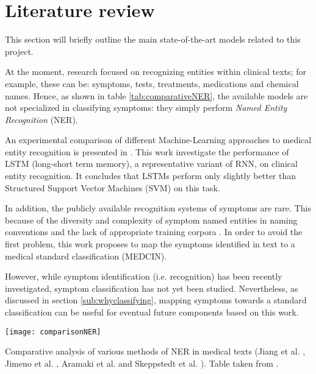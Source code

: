 \section{Literature review}
This section will briefly outline the main state-of-the-art models related to this project.

At the moment, research focused on recognizing entities within clinical texts; for example, these can be: symptoms, tests, treatments, medications and chemical names. Hence, as shown in table \ref{tab:comparativeNER}, the available models are not specialized in classifying symptoms: they simply perform \textit{Named Entity Recognition} (NER).

An experimental comparison of different Machine-Learning approaches to medical entity recognition is presented in \cite{liu2017}. This work investigate the performance of LSTM (long-short term memory), a representative variant of RNN, on clinical entity recognition. It concludes that LSTMs perform only slightly better than Structured Support Vector Machines (SVM) on this task.

In addition, the publicly available recognition systems of symptoms are rare. This because of the diversity and complexity of symptom named entities in naming conventions and the lack of appropriate training corpora \cite{wei2016disease}. In order to avoid the first problem, this work proposes to map the symptoms identified in text to a medical standard classification (MEDCIN).
 
However, while symptom identification (i.e. recognition) has been recently investigated, symptom classification has not yet been studied. Nevertheless, as discussed in section \ref{sub:whyclassifying}, mapping symptoms towards a standard classification can be useful for eventual future components based on this work.

\hspace*{2in}
\begin{table}[h]
  \centering
  \texttt{[image: comparisonNER]}
  \caption{Comparative analysis of various methods of NER in medical texts (Jiang et al. \cite{jiang2011}, Jimeno et al. \cite{jimeno2008}, Aramaki et al. \cite{aramaki2009} and Skeppstedt et al. \cite{skeppstedt2014}). Table taken from \cite{NERoverEHR}.}
  \label{tab:comparativeNER}
\end{table}
